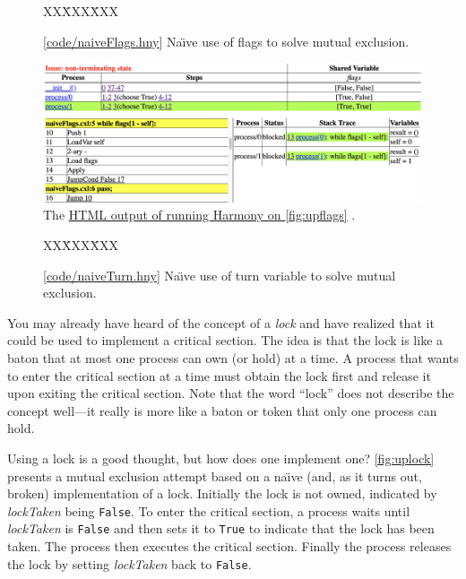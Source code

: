 \documentclass{report}
\newcommand{\harmonysource}[1]{
\begin{tabbing}
XX\=XXX\=XXX\kill
    
\end{tabbing}
}
\newcommand{\harmonylink}[1]{%
[\href{https://www.cs.cornell.edu/home/rvr/harmony/#1}{\underline{#1}}]%
}
\newcommand{\harmonyref}[2]{%
\href{https://www.cs.cornell.edu/home/rvr/harmony/output/#1}{\underline{#2}}%
}
\newenvironment{code}{
\tcolorbox
}{
\endtcolorbox
}
\begin{document}
\begin{figure}
\begin{code}
\harmonysource{naiveFlags}
\end{code}
\caption{\harmonylink{code/naiveFlags.hny} Na\"{\i}ve use of flags to solve mutual exclusion.}
\label{fig:upflags}
\end{figure}

\begin{figure}
\includegraphics[width=\textwidth]{figures/naiveFlags.png}
\caption{The \harmonyref{naiveFlags.html}{HTML output of running Harmony on \autoref{fig:upflags}}.}
\label{fig:naiveflagshtml}
\end{figure}

\begin{figure}
\begin{code}
\harmonysource{naiveTurn}
\end{code}
\caption{\harmonylink{code/naiveTurn.hny} Na\"{\i}ve use of turn variable to solve mutual exclusion.}
\label{fig:upturn}
\end{figure}

%

You may already have heard of the concept of a \emph{lock}
%
and have realized that
it could be used to implement a critical section.
The idea is that the lock is like a baton that at most one process can own
(or hold) at a time.
A process that wants to enter the critical section at a time must obtain the
lock first and release it upon exiting the critical section.
Note that the word ``lock'' does not describe the concept well---it really
is more like a baton or token that only one process can hold.

Using a lock is a good thought, but how does one implement one?
\autoref{fig:uplock} presents a mutual exclusion attempt based on a
na\"{\i}ve (and, as it turns out, broken) implementation of a lock.
Initially the lock is not owned, indicated by \textit{lockTaken} being \texttt{False}.
To enter the critical section, a process waits until \textit{lockTaken} is \texttt{False}
and then sets it to \texttt{True} to indicate that the lock has been taken.
The process then executes the critical section.  Finally the process
releases the lock by setting \textit{lockTaken} back to \texttt{False}.
\end{document}
